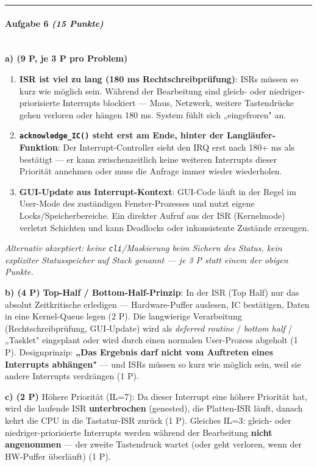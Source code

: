 \documentclass[11pt, a4paper]{article}
\begin{document}
\noindent\textcolor{rulegray}{\rule{\linewidth}{0.4pt}}


\paragraph{Aufgabe 6 \textit{(15 Punkte)}}\mbox{}\\[2pt]

\textbf{a) (9 P, je 3 P pro Problem)}


\begin{enumerate}
  \item \textbf{ISR ist viel zu lang (180 ms Rechtschreibprüfung)}: ISRs müssen so kurz wie möglich sein. Während der Bearbeitung sind gleich- oder niedriger-priorisierte Interrupts blockiert — Maus, Netzwerk, weitere Tastendrücke gehen verloren oder hängen 180 ms. System fühlt sich „eingefroren" an.
  \item \textbf{\texttt{acknowledge\_IC()} steht erst am Ende, hinter der Langläufer-Funktion}: Der Interrupt-Controller sieht den IRQ erst nach 180+ ms als bestätigt — er kann zwischenzeitlich keine weiteren Interrupts dieser Priorität annehmen oder muss die Anfrage immer wieder wiederholen.
  \item \textbf{GUI-Update aus Interrupt-Kontext}: GUI-Code läuft in der Regel im User-Mode des zuständigen Fenster-Prozesses und nutzt eigene Locks/Speicherbereiche. Ein direkter Aufruf aus der ISR (Kernelmode) verletzt Schichten und kann Deadlocks oder inkonsistente Zustände erzeugen.
\end{enumerate}

\textit{Alternativ akzeptiert: keine \texttt{cli}/Maskierung beim Sichern des Status, kein expliziter Statusspeicher auf Stack genannt — je 3 P statt einem der obigen Punkte.}


\textbf{b) (4 P)} \textbf{Top-Half / Bottom-Half-Prinzip}: In der ISR (Top Half) nur das absolut Zeitkritische erledigen — Hardware-Puffer auslesen, IC bestätigen, Daten in eine Kernel-Queue legen (2 P). Die langwierige Verarbeitung (Rechtschreibprüfung, GUI-Update) wird als \textit{deferred routine} / \textit{bottom half} / „Tasklet" eingeplant oder wird durch einen normalen User-Prozess abgeholt (1 P). Designprinzip: \textbf{„Das Ergebnis darf nicht vom Auftreten eines Interrupts abhängen"} — und ISRs müssen so kurz wie möglich sein, weil sie andere Interrupts verdrängen (1 P).


\textbf{c) (2 P)} Höhere Priorität (IL=7): Da dieser Interrupt eine höhere Priorität hat, wird die laufende ISR \textbf{unterbrochen} (genested), die Platten-ISR läuft, danach kehrt die CPU in die Tastatur-ISR zurück (1 P). Gleiches IL=3: gleich- oder niedriger-priorisierte Interrupts werden während der Bearbeitung \textbf{nicht angenommen} — der zweite Tastendruck wartet (oder geht verloren, wenn der HW-Puffer überläuft) (1 P).
\end{document}
